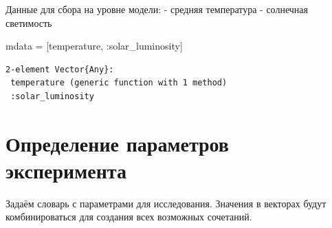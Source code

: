 \documentclass[
  12pt,
  a4paper,
  DIV=11,
  numbers=noendperiod]{scrreprt}
\newenvironment{Shaded}{\begin{snugshade}}{\end{snugshade}}
\newcommand{\NormalTok}[1]{\textcolor[rgb]{0.00,0.23,0.31}{#1}}
\newcommand{\OperatorTok}[1]{\textcolor[rgb]{0.37,0.37,0.37}{#1}}
\begin{document}
Данные для сбора на уровне модели: - средняя температура - солнечная
светимость

\begin{Shaded}
\begin{Highlighting}[]
\NormalTok{mdata }\OperatorTok{=}\NormalTok{ [temperature, }\OperatorTok{:}\NormalTok{solar\_luminosity]}
\end{Highlighting}
\end{Shaded}

\begin{verbatim}
2-element Vector{Any}:
 temperature (generic function with 1 method)
 :solar_luminosity
\end{verbatim}

\section{Определение параметров
эксперимента}\label{ux43eux43fux440ux435ux434ux435ux43bux435ux43dux438ux435-ux43fux430ux440ux430ux43cux435ux442ux440ux43eux432-ux44dux43aux441ux43fux435ux440ux438ux43cux435ux43dux442ux430-2}

Задаём словарь с параметрами для исследования. Значения в векторах будут
комбинироваться для создания всех возможных сочетаний.
\end{document}
